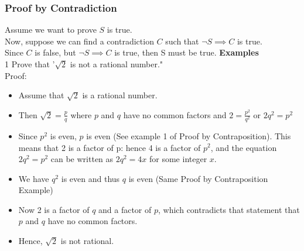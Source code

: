 \documentclass[12pt, letterpaper]{article}
\newcommand{\exheader}[1][ex]{{\tiny{#1}\normalsize}}
\begin{document}
\pagebreak

\subsubsection{Proof by Contradiction}
Assume we want to prove $S$ is true. \\ Now, suppose we can find a contradiction $C$ such that $\neg S \implies C$ is true. \\ Since $C$ is false, but $\neg S \implies C$ is true, then S must be true.
\bigbreak
\textbf{Examples} \\
\exheader[1] Prove that '$\sqrt{2}$ is not a rational number." \\ Proof:
\vspace*{-0.25cm}
\begin{itemize}[leftmargin=*, label={}]
	\item Assume that $\sqrt{2}$ is a rational number.
	\item Then $\sqrt{2} = \frac{p}{q}$ where $p$ and $q$ have no common factors and $2 = \frac{p^2}{q^2}$ or $2q^2 = p^2$
	\item Since $p^2$ is even, $p$ is even (See example 1 of Proof by Contraposition). This means that 2 is a factor of p: hence 4 is a factor of $p^2$, and the equation $2q^2 = p^2$ can be written as $2q^2 = 4x$ for some integer $x$.
	\item We have $q^2$ is even and thus $q$ is even (Same Proof by Contraposition Example)
	\item Now 2 is a factor of $q$ and a factor of $p$, which contradicts that statement that $p$ and $q$ have no common factors.
	\item Hence, $\sqrt{2}$ is not rational.
\end{itemize}

\pagebreak
\end{document}
